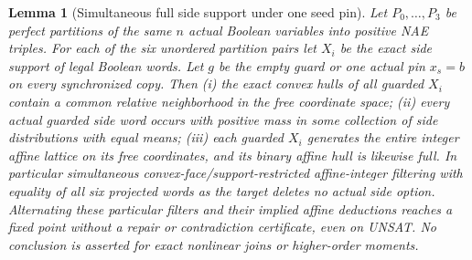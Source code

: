 \documentclass[11pt]{article}
\newtheorem{lemma}[theorem]{Lemma}
\begin{document}
\begin{lemma}[Simultaneous full side support under one seed pin]\label{lem:m22-hull}
Let $P_0,\dots,P_3$ be perfect partitions of the same $n$ actual Boolean variables into positive NAE triples. For each of the six unordered partition pairs let $X_i$ be the exact side support of legal Boolean words. Let $g$ be the empty guard or one actual pin $x_s=b$ on every synchronized copy. Then (i) the exact convex hulls of all guarded $X_i$ contain a common relative neighborhood in the free coordinate space; (ii) every actual guarded side word occurs with positive mass in some collection of side distributions with equal means; (iii) each guarded $X_i$ generates the entire integer affine lattice on its free coordinates, and its binary affine hull is likewise full. In particular simultaneous convex-face/support-restricted affine-integer filtering with equality of all six projected words as the target deletes no actual side option. Alternating these particular filters and their implied affine deductions reaches a fixed point without a repair or contradiction certificate, even on UNSAT. No conclusion is asserted for exact nonlinear joins or higher-order moments.
\end{lemma}
\end{document}
